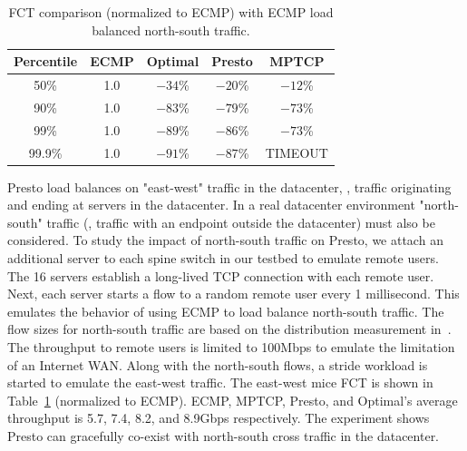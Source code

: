 \begin{table}[!htb]
\begin{center}
\begin{tabular}{ |c|c|c|c|c| }
 \hline

 Percentile & ECMP & Optimal & Presto & MPTCP \\
 \hline
 50\%       & 1.0 & $-34$\%     & $-20$\%   & $-12$\% \\
 90\%       & 1.0 & $-83$\%     & $-79$\%   & $-73$\% \\
 99\%       & 1.0 & $-89$\%     & $-86$\%   & $-73$\% \\
 99.9\%     & 1.0 & $-91$\%      & $-87$\%   & TIMEOUT \\

 \hline
\end{tabular}
\caption{FCT comparison (normalized to ECMP) with ECMP load balanced north-south traffic.}
	\label{macro_evaluation_north_south_traffic}
\end{center}
\end{table}


Presto load balances on "east-west" traffic in the datacenter, \ie{}, traffic
originating and ending at servers in the datacenter. 
In a real datacenter environment "north-south" traffic (\ie{}, traffic with an endpoint outside the datacenter)
must also be considered. 
To study the impact of north-south traffic on Presto, we attach an additional server to 
each spine switch in our testbed to emulate remote users. 
The 16 servers establish a long-lived TCP connection with each remote user. 
Next, each server starts a flow to a random remote user every 1 millisecond. This emulates  
the behavior of using ECMP to load balance north-south traffic.
The flow sizes for north-south traffic are based on the distribution measurement in~\cite{he2013next}. 
The throughput to remote users is limited to 100Mbps to emulate the limitation of an Internet WAN. 
Along with the north-south flows, 
a stride workload is started to emulate the east-west traffic. 
The east-west mice FCT is shown in Table~\ref{macro_evaluation_north_south_traffic} (normalized to ECMP). 
ECMP, MPTCP, Presto, and Optimal's average throughput is 
5.7, 7.4, 8.2, and 8.9Gbps respectively. 
The experiment shows Presto can gracefully co-exist with north-south cross traffic
in the datacenter.


